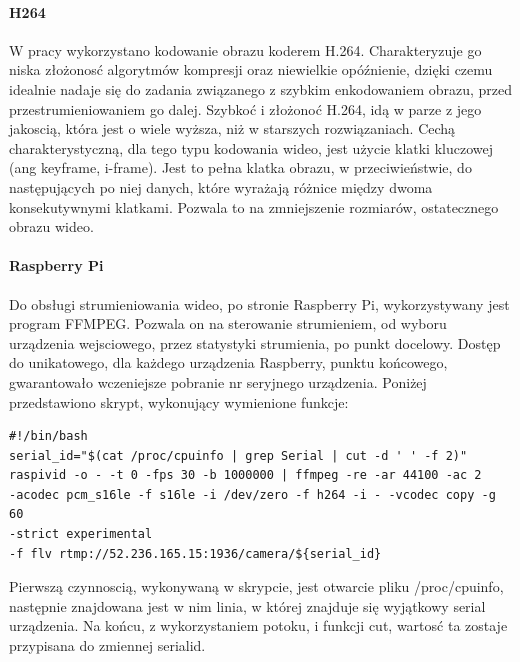 \paragraph{H264}
W pracy wykorzystano kodowanie obrazu koderem H.264. Charakteryzuje go niska złożonosć algorytmów kompresji oraz niewielkie opóźnienie, dzięki czemu idealnie nadaje się do zadania związanego z szybkim enkodowaniem obrazu, przed przestrumieniowaniem go dalej.
Szybkoć i złożonoć H.264, idą w parze z jego jakoscią, która jest o wiele wyższa, niż w starszych rozwiązaniach.
Cechą charakterystyczną, dla tego typu kodowania wideo, jest użycie klatki kluczowej (ang keyframe, i-frame). Jest to pełna klatka obrazu, w przeciwieństwie, do następujących po niej danych, które wyrażają różnice między dwoma konsekutywnymi klatkami. Pozwala to na zmniejszenie rozmiarów, ostatecznego obrazu wideo.

\paragraph{Raspberry Pi}
Do obsługi strumieniowania wideo, po stronie Raspberry Pi, wykorzystywany jest program FFMPEG. Pozwala on na sterowanie strumieniem, od wyboru urządzenia wejsciowego, przez statystyki strumienia, po punkt docelowy. Dostęp do unikatowego, dla każdego urządzenia Raspberry, punktu końcowego, gwarantowało wczeniejsze pobranie nr seryjnego urządzenia. Poniżej przedstawiono skrypt, wykonujący wymienione funkcje:
\begin{verbatim}
#!/bin/bash
serial_id="$(cat /proc/cpuinfo | grep Serial | cut -d ' ' -f 2)"
raspivid -o - -t 0 -fps 30 -b 1000000 | ffmpeg -re -ar 44100 -ac 2 
-acodec pcm_s16le -f s16le -i /dev/zero -f h264 -i - -vcodec copy -g 60 
-strict experimental 
-f flv rtmp://52.236.165.15:1936/camera/${serial_id}
\end{verbatim}
Pierwszą czynnoscią, wykonywaną w skrypcie, jest otwarcie pliku /proc/cpuinfo, następnie znajdowana jest w nim linia, w której znajduje się wyjątkowy serial urządzenia. Na końcu, z wykorzystaniem potoku, i funkcji cut, wartosć ta zostaje przypisana do zmiennej serialid.


